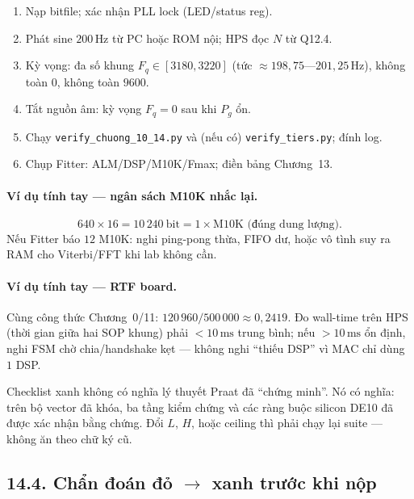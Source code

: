 \begin{enumerate}[leftmargin=1.4em]
  \item Nạp bitfile; xác nhận PLL lock (LED/status reg).
  \item Phát sine $200\,\text{Hz}$ từ PC hoặc ROM nội; HPS đọc $N$ từ Q12.4.
  \item Kỳ vọng: đa số khung $F_q\in[3180,3220]$ (tức $\approx 198{,}75$---$201{,}25\,\text{Hz}$), không toàn $0$, không toàn $9600$.
  \item Tắt nguồn âm: kỳ vọng $F_q=0$ sau khi $P_g$ ổn.
  \item Chạy \texttt{verify\_chuong\_10\_14.py} và (nếu có) \texttt{verify\_tiers.py}; đính log.
  \item Chụp Fitter: ALM/DSP/M10K/Fmax; điền bảng Chương~13.
\end{enumerate}

\paragraph{Ví dụ tính tay --- ngân sách M10K nhắc lại.}
\[
640\times 16 = 10\,240\ \text{bit} = 1\times\text{M10K (đúng dung lượng)}.
\]
Nếu Fitter báo $12$ M10K: nghi ping-pong thừa, FIFO dư, hoặc vô tình suy ra RAM cho Viterbi/FFT khi lab không cần.

\paragraph{Ví dụ tính tay --- RTF board.}
Cùng công thức Chương~0/11: $120\,960/500\,000\approx 0{,}2419$. Đo wall-time trên HPS (thời gian giữa hai SOP khung) phải $<10\,\text{ms}$ trung bình; nếu $>10\,\text{ms}$ ổn định, nghi FSM chờ chia/handshake kẹt --- không nghi ``thiếu DSP'' vì MAC chỉ dùng $1$ DSP.

\begin{physicalinsight}
Checklist xanh không có nghĩa lý thuyết Praat đã ``chứng minh''. Nó có nghĩa: trên bộ vector đã khóa, ba tầng kiểm chứng và các ràng buộc silicon DE10 đã được xác nhận bằng chứng. Đổi $L$, $H$, hoặc ceiling thì phải chạy lại suite --- không ăn theo chữ ký cũ.
\end{physicalinsight}

\subsection*{14.4. Chẩn đoán đỏ $\to$ xanh trước khi nộp}

